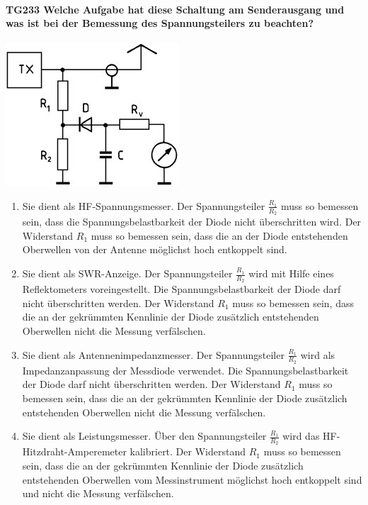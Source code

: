 \documentclass[8pt]{article}
\begin{document}
\paragraph*{TG233 Welche Aufgabe hat diese Schaltung am Senderausgang und was ist bei der Bemessung des Spannungsteilers zu beachten?}
\begin{center}
	\begin{minipage}{\linewidth}
		\centering
		\includegraphics[scale=1.0]{pics/tg233_a.jpg}
	\end{minipage}
\end{center}
\begin{enumerate}[nolistsep,label=\Alph*]
\item Sie dient als HF-Spannungsmesser. Der Spannungsteiler $\frac{R_{1}}{R_{2}}$ muss so bemessen sein, dass die Spannungsbelastbarkeit der Diode nicht überschritten wird. Der Widerstand $R_{1}$ muss so bemessen sein, dass die an der Diode entstehenden Oberwellen von der Antenne möglichst hoch entkoppelt sind. 
\item Sie dient als SWR-Anzeige. Der Spannungsteiler $\frac{R_{1}}{R_{2}}$ wird mit Hilfe eines Reflektometers voreingestellt. Die Spannungsbelastbarkeit der Diode darf nicht überschritten werden. Der Widerstand $R_{1}$ muss so bemessen sein, dass die an der gekrümmten Kennlinie der Diode zusätzlich entstehenden Oberwellen nicht die Messung verfälschen.
\item Sie dient als Antennenimpedanzmesser. Der Spannungsteiler $\frac{R_{1}}{R_{2}}$ wird als Impedanzanpassung der Messdiode verwendet. Die Spannungsbelastbarkeit der Diode darf nicht überschritten werden. Der Widerstand $R_{1}$ muss so bemessen sein, dass die an der gekrümmten Kennlinie der Diode zusätzlich entstehenden Oberwellen nicht die Messung verfälschen.
\item Sie dient als Leistungsmesser. Über den Spannungsteiler $\frac{R_{1}}{R_{2}}$ wird das HF-Hitzdraht-Amperemeter kalibriert. Der Widerstand $R_{1}$ muss so bemessen sein, dass die an der gekrümmten Kennlinie der Diode zusätzlich entstehenden Oberwellen vom Messinstrument möglichst hoch entkoppelt sind und nicht die Messung verfälschen.
\end{enumerate}
\end{document}
